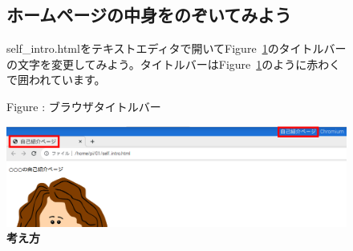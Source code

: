 \documentclass[a4paper,12pt]{jarticle}
\begin{document}
\clearpage
\begin{figure}[ht]
  \subsection{\theExercise ホームページの中身をのぞいてみよう}
  self\_intro.htmlをテキストエディタで開いてFigure~\ref{seq:refFigure31}のタイトルバーの文字を変更してみよう。タイトルバーはFigure~\ref{seq:refFigure31}のように赤わくで囲われています。


  \bigskip



  \centering
  \begin{minipage}{\textwidth}
    {\upshape
      Figure {\theFigure\label{seq:refFigure31}}:
      ブラウザタイトルバー}
  \end{minipage}

  \centering
  \includegraphics[width=\textwidth]{textbook-img143.png}
  \flushleft
  \textbf{考え方}


\end{figure}
\end{document}
